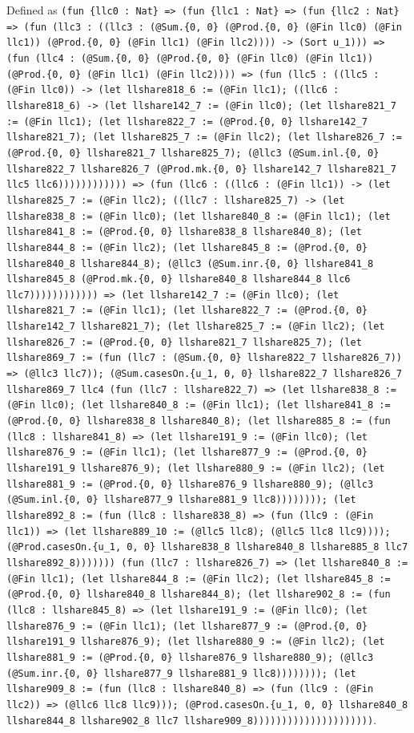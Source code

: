 \documentclass[11pt]{article}
\begin{document}
\noindent Defined as \texttt{(fun \{llc0 : Nat\} => (fun \{llc1 : Nat\} => (fun \{llc2 : Nat\} => (fun (llc3 : ((llc3 : (@Sum.\{0, 0\} (@Prod.\{0, 0\} (@Fin llc0) (@Fin llc1)) (@Prod.\{0, 0\} (@Fin llc1) (@Fin llc2)))) -> (Sort u\_1))) => (fun (llc4 : (@Sum.\{0, 0\} (@Prod.\{0, 0\} (@Fin llc0) (@Fin llc1)) (@Prod.\{0, 0\} (@Fin llc1) (@Fin llc2)))) => (fun (llc5 : ((llc5 : (@Fin llc0)) -> (let llshare818\_6 := (@Fin llc1); ((llc6 : llshare818\_6) -> (let llshare142\_7 := (@Fin llc0); (let llshare821\_7 := (@Fin llc1); (let llshare822\_7 := (@Prod.\{0, 0\} llshare142\_7 llshare821\_7); (let llshare825\_7 := (@Fin llc2); (let llshare826\_7 := (@Prod.\{0, 0\} llshare821\_7 llshare825\_7); (@llc3 (@Sum.inl.\{0, 0\} llshare822\_7 llshare826\_7 (@Prod.mk.\{0, 0\} llshare142\_7 llshare821\_7 llc5 llc6)))))))))))) => (fun (llc6 : ((llc6 : (@Fin llc1)) -> (let llshare825\_7 := (@Fin llc2); ((llc7 : llshare825\_7) -> (let llshare838\_8 := (@Fin llc0); (let llshare840\_8 := (@Fin llc1); (let llshare841\_8 := (@Prod.\{0, 0\} llshare838\_8 llshare840\_8); (let llshare844\_8 := (@Fin llc2); (let llshare845\_8 := (@Prod.\{0, 0\} llshare840\_8 llshare844\_8); (@llc3 (@Sum.inr.\{0, 0\} llshare841\_8 llshare845\_8 (@Prod.mk.\{0, 0\} llshare840\_8 llshare844\_8 llc6 llc7)))))))))))) => (let llshare142\_7 := (@Fin llc0); (let llshare821\_7 := (@Fin llc1); (let llshare822\_7 := (@Prod.\{0, 0\} llshare142\_7 llshare821\_7); (let llshare825\_7 := (@Fin llc2); (let llshare826\_7 := (@Prod.\{0, 0\} llshare821\_7 llshare825\_7); (let llshare869\_7 := (fun (llc7 : (@Sum.\{0, 0\} llshare822\_7 llshare826\_7)) => (@llc3 llc7)); (@Sum.casesOn.\{u\_1, 0, 0\} llshare822\_7 llshare826\_7 llshare869\_7 llc4 (fun (llc7 : llshare822\_7) => (let llshare838\_8 := (@Fin llc0); (let llshare840\_8 := (@Fin llc1); (let llshare841\_8 := (@Prod.\{0, 0\} llshare838\_8 llshare840\_8); (let llshare885\_8 := (fun (llc8 : llshare841\_8) => (let llshare191\_9 := (@Fin llc0); (let llshare876\_9 := (@Fin llc1); (let llshare877\_9 := (@Prod.\{0, 0\} llshare191\_9 llshare876\_9); (let llshare880\_9 := (@Fin llc2); (let llshare881\_9 := (@Prod.\{0, 0\} llshare876\_9 llshare880\_9); (@llc3 (@Sum.inl.\{0, 0\} llshare877\_9 llshare881\_9 llc8)))))))); (let llshare892\_8 := (fun (llc8 : llshare838\_8) => (fun (llc9 : (@Fin llc1)) => (let llshare889\_10 := (@llc5 llc8); (@llc5 llc8 llc9)))); (@Prod.casesOn.\{u\_1, 0, 0\} llshare838\_8 llshare840\_8 llshare885\_8 llc7 llshare892\_8))))))) (fun (llc7 : llshare826\_7) => (let llshare840\_8 := (@Fin llc1); (let llshare844\_8 := (@Fin llc2); (let llshare845\_8 := (@Prod.\{0, 0\} llshare840\_8 llshare844\_8); (let llshare902\_8 := (fun (llc8 : llshare845\_8) => (let llshare191\_9 := (@Fin llc0); (let llshare876\_9 := (@Fin llc1); (let llshare877\_9 := (@Prod.\{0, 0\} llshare191\_9 llshare876\_9); (let llshare880\_9 := (@Fin llc2); (let llshare881\_9 := (@Prod.\{0, 0\} llshare876\_9 llshare880\_9); (@llc3 (@Sum.inr.\{0, 0\} llshare877\_9 llshare881\_9 llc8)))))))); (let llshare909\_8 := (fun (llc8 : llshare840\_8) => (fun (llc9 : (@Fin llc2)) => (@llc6 llc8 llc9))); (@Prod.casesOn.\{u\_1, 0, 0\} llshare840\_8 llshare844\_8 llshare902\_8 llc7 llshare909\_8)))))))))))))))))))))}.\par
\end{document}
